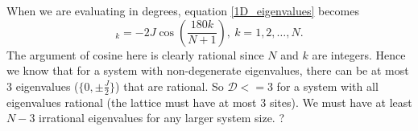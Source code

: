 \documentclass[a4paper,10pt]{article}
\begin{document}
When we are evaluating in degrees, equation \ref{1D_eigenvalues} becomes
\begin{equation}
 _k=-2J\cos\left(\frac{180k}{N+1}\right), \ k=1,2,\dots,N.
\end{equation}
The argument of cosine here is clearly rational since $N$ and $k$ are integers. Hence we know that for a system with non-degenerate eigenvalues, there can be at most $3$ eigenvalues ($\{0,\pm\frac{J}{2}\}$)
that are rational. So $\mathcal{D}<=3$ for a system with all eigenvalues rational (the lattice must have at most $3$ sites). We must have at least $N-3$ irrational eigenvalues for any larger system size. 
?


\newpage






\end{document}

